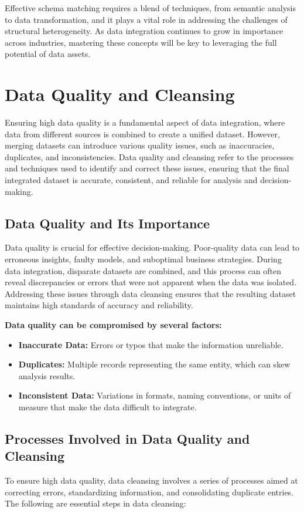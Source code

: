 \documentclass[12pt]{article}
\begin{document}
Effective schema matching requires a blend of techniques, from semantic analysis to data transformation, and it plays a vital role in addressing the challenges of structural heterogeneity. As data integration continues to grow in importance across industries, mastering these concepts will be key to leveraging the full potential of data assets.

\section{Data Quality and Cleansing}
Ensuring high data quality is a fundamental aspect of data integration, where data from different sources is combined to create a unified dataset. However, merging datasets can introduce various quality issues, such as inaccuracies, duplicates, and inconsistencies. Data quality and cleansing refer to the processes and techniques used to identify and correct these issues, ensuring that the final integrated dataset is accurate, consistent, and reliable for analysis and decision-making.

\subsection{Data Quality and Its Importance}
Data quality is crucial for effective decision-making. Poor-quality data can lead to erroneous insights, faulty models, and suboptimal business strategies. During data integration, disparate datasets are combined, and this process can often reveal discrepancies or errors that were not apparent when the data was isolated. Addressing these issues through data cleansing ensures that the resulting dataset maintains high standards of accuracy and reliability.

\textbf{Data quality can be compromised by several factors:}
\begin{itemize}
    \item \textbf{Inaccurate Data:} Errors or typos that make the information unreliable.
    \item \textbf{Duplicates:} Multiple records representing the same entity, which can skew analysis results.
    \item \textbf{Inconsistent Data:} Variations in formats, naming conventions, or units of measure that make the data difficult to integrate.
\end{itemize}

\subsection{Processes Involved in Data Quality and Cleansing}
To ensure high data quality, data cleansing involves a series of processes aimed at correcting errors, standardizing information, and consolidating duplicate entries. The following are essential steps in data cleansing:
\end{document}

